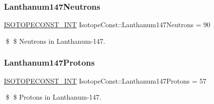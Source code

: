 \subsubsection{\texorpdfstring{Lanthanum147\+Neutrons}{Lanthanum147Neutrons}}
{\footnotesize\ttfamily \mbox{\hyperlink{group___isotope_const-_macros_ga5f18360b3e99483a35c32d789e62621c}{I\+S\+O\+T\+O\+P\+E\+C\+O\+N\+S\+T\+\_\+\+I\+NT}} Isotope\+Const\+::\+Lanthanum147\+Neutrons = 90}

\$ \$ Neutrons in Lanthanum-\/147. \mbox{\label{group___isotope_const-_lanthanum-_la147_gae536f3bd027684c0635ef78517cb3106}} 
\subsubsection{\texorpdfstring{Lanthanum147\+Protons}{Lanthanum147Protons}}
{\footnotesize\ttfamily \mbox{\hyperlink{group___isotope_const-_macros_ga5f18360b3e99483a35c32d789e62621c}{I\+S\+O\+T\+O\+P\+E\+C\+O\+N\+S\+T\+\_\+\+I\+NT}} Isotope\+Const\+::\+Lanthanum147\+Protons = 57}

\$ \$ Protons in Lanthanum-\/147. 